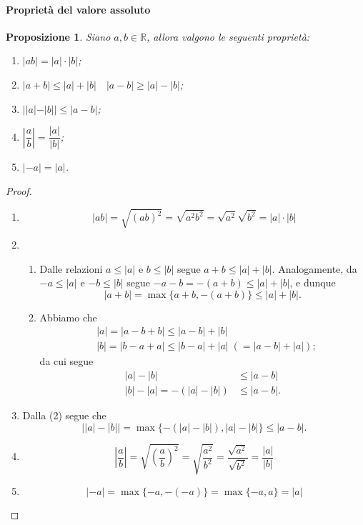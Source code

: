 \documentclass{article}
\theoremstyle{plain}
\newtheorem{prop}[thm]{Proposizione}
\theoremstyle{definition}
\theoremstyle{remark}
\begin{document}
\paragraph{Proprietà del valore assoluto}
\begin{bxthm}
\begin{prop}
    Siano $a,b\in\mathbb{R}$, allora valgono le seguenti proprietà:
    \begin{enumerate}
        \item $|ab|=|a|\cdot|b|$;
        \item $|a+b|\leq|a|+|b|\quad|a-b|\geq|a|-|b|$;
        \item $||a|-|b||\leq|a-b|$;
        \item $\left|\dfrac{a}{b}\right|=\dfrac{|a|}{|b|}$;
        \item $|-a|=|a|$.
    \end{enumerate}
\end{prop}
\end{bxthm}
\begin{proof}\hfill
    \begin{enumerate}
        \item \[|ab|=\sqrt{(ab)^2}=\sqrt{a^2b^2}=\sqrt{a^2}\sqrt{b^2}=|a|\cdot|b|\]
        \item 
        \begin{enumerate}
            \item Dalle relazioni $a\leq |a|$ e $b\leq |b|$ segue $a+b\leq|a|+|b|$.
            Analogamente, da $-a\leq|a|$ e $-b\leq|b|$ segue $-a-b=-(a+b)\leq|a|+|b|$, e dunque 
            \[|a+b|=\max\{a+b,-(a+b)\}\leq|a|+|b|.\]
            \item Abbiamo che 
            \begin{align*}
                &|a|=|a-b+b|\leq|a-b|+|b|\\
                &|b|=|b-a+a|\leq|b-a|+|a|\;(=|a-b|+|a|);
            \end{align*}
            da cui segue 
            \begin{align*}
                |a|-|b|&\leq|a-b|\\
                |b|-|a|=-(|a|-|b|)&\leq|a-b|.
            \end{align*}
        \end{enumerate}
        \item Dalla (2) segue che \[\left||a|-|b|\right|=\max\{-(|a|-|b|),|a|-|b|\}\leq |a-b|.\]
        \item \[\left|\dfrac{a}{b}\right|=\sqrt{\left(\dfrac{a}{b}\right)^2}=\sqrt{\dfrac{a^2}{b^2}}=\dfrac{\sqrt{a^2}}{\sqrt{b^2}}=\dfrac{|a|}{|b|}\]
        \item \[|-a|=\max\{-a,-(-a)\}=\max\{-a,a\}=|a|\]
    \end{enumerate}
\end{proof}
\end{document}
